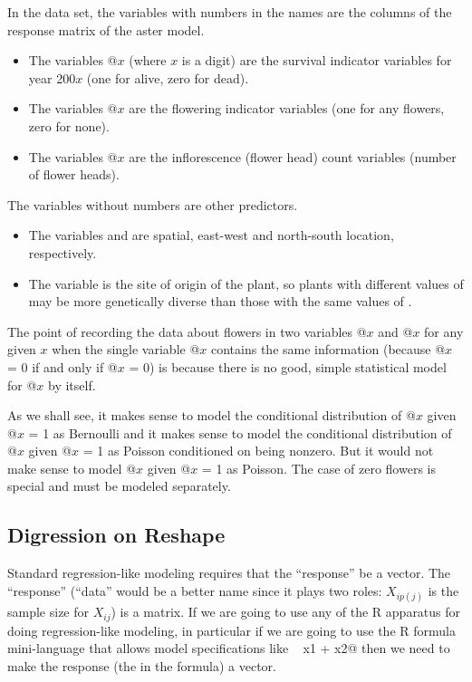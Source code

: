 \documentclass[11pt]{article}
\begin{document}
In the \verb@echinacea@ data set,
the variables with numbers in the names are the columns of the response
matrix of the aster model.
\begin{itemize}
\item
The variables @$x$ (where $x$ is
a digit) are the survival indicator variables for year 200$x$
(one for alive, zero for dead).
\item
The variables @$x$ are the flowering indicator variables
(one for any flowers, zero for none).
\item
The variables @$x$ are the inflorescence (flower head) count
variables (number of flower heads).
\end{itemize}
The variables without numbers are other predictors.
\begin{itemize}
\item
The variables \verb@ewloc@ and \verb@nsloc@ are spatial, east-west
and north-south location, respectively.  
\item
The variable \verb@site@ is the site of origin of the plant, so plants
with different values of \verb@site@ may be more genetically diverse
than those with the same values of \verb@site@.
\end{itemize}

The point of recording the data about flowers in two variables
@$x$ and @$x$ for any given $x$ when the
single variable @$x$ contains the same information
(because @$x$ = 0 if and only if @$x$ = 0)
is because there is no good, simple statistical model for @$x$
by itself.

As we shall see, it makes sense to model the conditional distribution of
@$x$ given @$x$ = 1 as Bernoulli and it makes sense
to model the conditional distribution of
@$x$ given @$x$ = 1 as Poisson conditioned on being
nonzero.  But it would not make sense to model @$x$
given @$x$ = 1 as Poisson.  The case of zero flowers is special
and must be modeled separately.

\subsection{Digression on Reshape}

Standard regression-like modeling requires that the ``response'' be
a vector.  The ``response'' (``data'' would be a better name since it
plays two roles: $X_{i p(j)}$ is the sample size for $X_{i j}$) is a
matrix.  If we are going to use any of the R apparatus for doing
regression-like modeling, in particular if we are going to use the
R formula mini-language that allows model specifications like
\verb@y ~ x1 + x2@ then we need to make the response (the \verb@y@
in the formula) a vector.
\end{document}
